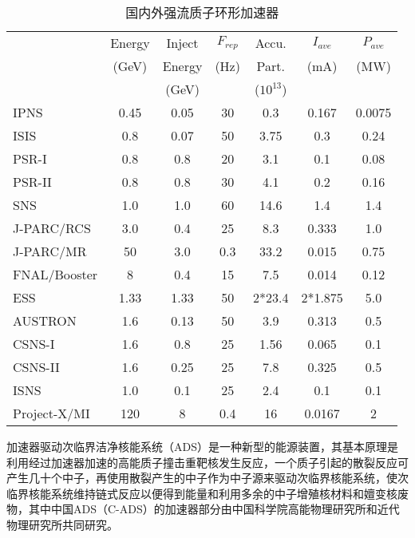 \begin{table}[!htb]
  \centering
  \begin{tabular}{|>{\small}l|c|c|c|c|c|c|}
    \hline
                &Energy &Inject  &$F_{rep}$ &Accu.    &$I_{ave}$ &$P_{ave}$ \\
                &(GeV)  &Energy  &(Hz)      &Part.    &(mA)      &(MW)      \\
                &       &(GeV)   &          &($10^{13}$) &       &          \\
    \hline
    IPNS        &0.45   &0.05    &30        &0.3      &0.167     &0.0075    \\
    ISIS        &0.8    &0.07    &50        &3.75     &0.3       &0.24      \\
    PSR-I       &0.8    &0.8     &20        &3.1      &0.1       &0.08      \\
    PSR-II      &0.8    &0.8     &30        &4.1      &0.2       &0.16      \\
    SNS         &1.0    &1.0     &60        &14.6     &1.4       &1.4       \\
    J-PARC/RCS  &3.0    &0.4     &25        &8.3      &0.333     &1.0       \\
    J-PARC/MR   &50     &3.0     &0.3       &33.2     &0.015     &0.75      \\
    FNAL/Booster&8      &0.4     &15        &7.5      &0.014     &0.12      \\
    ESS         &1.33   &1.33    &50        &2*23.4   &2*1.875   &5.0       \\
    AUSTRON     &1.6    &0.13    &50        &3.9      &0.313     &0.5       \\
    CSNS-I      &1.6    &0.8     &25        &1.56     &0.065     &0.1       \\
    CSNS-II     &1.6    &0.25    &25        &7.8      &0.325     &0.5       \\
    ISNS        &1.0    &0.1     &25        &2.4      &0.1       &0.1       \\
    Project-X/MI&120    &8       &0.4       &16       &0.0167    &2         \\
    \hline
  \end{tabular}
  \caption{国内外强流质子环形加速器}
  \label{tab:proton_ring}
\end{table}

加速器驱动次临界洁净核能系统（ADS）是一种新型的能源装置，其基本原理是利用经过加速器加速的高能质子撞击重靶核发生反应，一个质子引起的散裂反应可产生几十个中子，再使用散裂产生的中子作为中子源来驱动次临界核能系统，使次临界核能系统维持链式反应以便得到能量和利用多余的中子增殖核材料和嬗变核废物，其中中国ADS（C-ADS）的加速器部分由中国科学院高能物理研究所和近代物理研究所共同研究。

